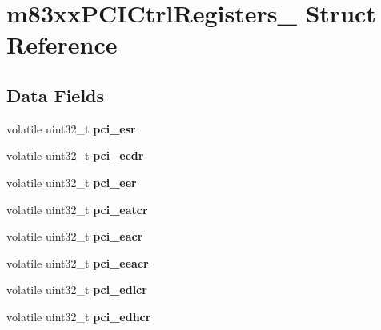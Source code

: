 \hypertarget{structm83xxPCICtrlRegisters__}{}\section{m83xx\+P\+C\+I\+Ctrl\+Registers\+\_\+ Struct Reference}
\label{structm83xxPCICtrlRegisters__}
\subsection*{Data Fields}
\begin{DoxyCompactItemize}
\item 
\mbox{\label{structm83xxPCICtrlRegisters___a24ab02a21ef8b501fdb1300d997c06fb}} 
volatile uint32\+\_\+t {\bfseries pci\+\_\+esr}
\item 
\mbox{\label{structm83xxPCICtrlRegisters___a93db87cc02690d78250720963462ffed}} 
volatile uint32\+\_\+t {\bfseries pci\+\_\+ecdr}
\item 
\mbox{\label{structm83xxPCICtrlRegisters___acb5d1ee11bde4eb835e70ca0883bff5c}} 
volatile uint32\+\_\+t {\bfseries pci\+\_\+eer}
\item 
\mbox{\label{structm83xxPCICtrlRegisters___ae685b06e5ce328c25a36fcec69b73868}} 
volatile uint32\+\_\+t {\bfseries pci\+\_\+eatcr}
\item 
\mbox{\label{structm83xxPCICtrlRegisters___a01c0bcea1e0d0654037b4a2933704f5a}} 
volatile uint32\+\_\+t {\bfseries pci\+\_\+eacr}
\item 
\mbox{\label{structm83xxPCICtrlRegisters___a20d1b8aef7a0d1c85cf333efc71b9641}} 
volatile uint32\+\_\+t {\bfseries pci\+\_\+eeacr}
\item 
\mbox{\label{structm83xxPCICtrlRegisters___a0a7cd5bbb8398ff21eb73e3a9d2e5273}} 
volatile uint32\+\_\+t {\bfseries pci\+\_\+edlcr}
\item 
\mbox{\label{structm83xxPCICtrlRegisters___a2544251bb521e242cdf2ed0aa866d362}} 
volatile uint32\+\_\+t {\bfseries pci\+\_\+edhcr}

\end{DoxyCompactItemize}
